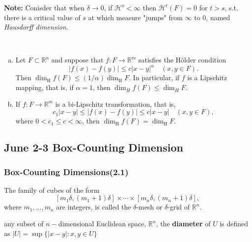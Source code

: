 \textbf{Note: }Conisder that when $\delta\rightarrow 0$, if $\mathcal{H}^s<\infty$ then $\mathcal{H}^t(F) = 0$ for $t>s$, s.t. there is a critical value of $s$ at which measure "jumps" from $\infty$ to $0$, named \textit{Hausdorff dimension}.



\begin{proposition}\label{H-under-L} $ $
    \begin{enumerate}[a.]
        \item Let $F \subset \mathbb{R}^{n}$ and suppose that $f: F \rightarrow \mathbb{R}^{m}$ satisfies the Hölder condition
$$
|f(x)-f(y)| \leq c|x-y|^{\alpha} \quad(x, y \in F) .
$$
Then $\operatorname{dim}_{\mathrm{H}} f(F) \leq(1 / \alpha) \operatorname{dim}_{\mathrm{H}} F .$ In particular, if $f$ is a Lipschitz
mapping, that is, if $\alpha=1$, then $\operatorname{dim}_{H} f(F) \leq \operatorname{dim}_{H} F$.
\item If $f: F \rightarrow \mathbb{R}^{m}$ is a bi-Lipschitz transformation, that is,
$$
c_{1}|x-y| \leq|f(x)-f(y)| \leq c|x-y| \quad(x, y \in F),
$$
where $0<c_{1} \leq c<\infty$, then $\operatorname{dim}_{\mathrm{H}} f(F)=\operatorname{dim}_{\mathrm{H}} F$.
    \end{enumerate}
\end{proposition}

\newpage

\subsection{June 2-3 Box-Counting Dimension}
\subsubsection{Box-Counting Dimensions(2.1)}

\begin{definition}
    The family of cubes of the form
$$
\left[m_{1} \delta,\left(m_{1}+1\right) \delta\right] \times \cdots \times\left[m_{n} \delta,\left(m_{n}+1\right) \delta\right],
$$
where $m_{1}, \ldots, m_{n}$ are integers, is called the $\delta$-mesh or $\delta$-grid of $\mathbb{R}^n$.
\end{definition}

\begin{definition}[Diameter]
    any subset of $n-$dimensional Euclidean space, $\mathbb{R}^n$, the \textbf{diameter} of $U$ is defined as $|U|=\sup \{|x-y|:x, y\in U\}$
\end{definition}

